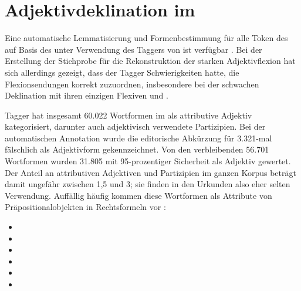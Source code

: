 \section[Adjektivdeklination im \tit{Corpus der altdeutschen Originalurkunden}]{Adjektivdeklination im \CAO{}}
\label{sec:adjdeclcao}

\label{phsec:formelhaftigkeit}
Eine automatische Lemmatisierung und Formenbestimmung für alle Token des
\CAO{} auf Basis des \REM{} unter Verwendung des Taggers von
\citet{schmid2019} ist verfügbar
\autocites[vgl.][207]{beckerschallert2021}[155--158]{beckerschallert2022b}. Bei
der Erstellung der Stichprobe für die Rekonstruktion der starken
Adjektivflexion hat sich allerdings gezeigt, dass der Tagger Schwierigkeiten
hatte, die Flexionsendungen korrekt zuzuordnen, insbesondere bei der schwachen
Deklination mit ihren einzigen Flexiven  und .

 Tagger hat insgesamt 60.022 Wortformen im \CAO{}
als attributive Adjektiv kategorisiert, darunter auch adjektivisch verwendete
Partizipien. Bei der automatischen Annotation wurde die editorische Abkürzung
 für  3.321-mal fälschlich als Adjektivform gekennzeichnet.
Von den verbleibenden 56.701 Wortformen wurden 31.805 mit 95-prozentiger
Sicherheit als Adjektiv gewertet. Der Anteil an attributiven Adjektiven und
Partizipien im ganzen Korpus beträgt damit ungefähr zwischen 1,5 und 3\pct{};
sie finden in den Urkunden also eher selten Verwendung. Auffällig häufig kommen
diese Wortformen als Attribute von Präpositionalobjekten in Rechtsformeln vor
\autocites[vgl.][30]{becker2016}:%

\begin{itemize}
	\item %
	\item {}
	\item %
	\item %
	\item %
	\item %
\end{itemize}

